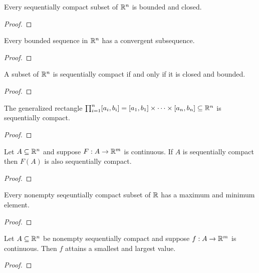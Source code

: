 \documentclass[letterpaper, twoside, 12pt]{book}
\begin{document}
\begin{theorem}[11.16]
  Every sequentially compact subset of \(\mathbb R^n\) is bounded and closed.
\end{theorem}
\begin{proof}

\end{proof}

\begin{theorem}[11.17]
  Every bounded sequence in \(\mathbb R^n\) has a convergent subsequence.
\end{theorem}
\begin{proof}

\end{proof}

\begin{theorem}
  A subset of \(\mathbb R^n\) is sequentially compact if and only if
  it is closed and bounded.
\end{theorem}
\begin{proof}

\end{proof}

\begin{corollary}[11.19]
  The generalized rectangle
  \(\prod_{i=1}^n[a_i,b_i]=[a_1,b_1]\times\dots\times[a_n,b_n]\subseteq\mathbb R^n\)
  is sequentially compact.
\end{corollary}
\begin{proof}

\end{proof}

\begin{theorem}[11.20]
  Let \(A\subseteq\mathbb R^n\) and suppose \(F:A\to\mathbb R^m\) is continuous.
  If \(A\) is sequentially compact then \(F(A)\) is also sequentially
  compact.
\end{theorem}
\begin{proof}

\end{proof}

\begin{lemma}[11.21]
  Every nonempty seqeuntially compact subset of \(\mathbb R\) has a
  maximum and minimum element.
\end{lemma}
\begin{proof}

\end{proof}

\begin{theorem}
  Let \(A\subseteq\mathbb R^n\) be nonempty sequentially compact
  and suppose \(f:A\to\mathbb R^m\) is continuous.
  Then \(f\) attains a smallest and largest value.
\end{theorem}
\begin{proof}

\end{proof}
\end{document}
